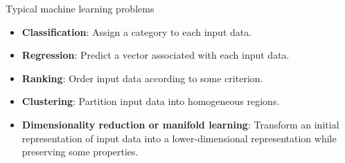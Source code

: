 \documentclass[xcolor={usenames,dvipsnames},handout]{beamer}
\begin{document}
\begin{frame}{Typical machine learning problems}

\begin{itemize}
\item \textbf{Classification}: Assign a category to each input data. 

\vspace{.2cm}

\item \textbf{Regression}: Predict a vector associated with each input data. 

\vspace{.2cm}

\item \textbf{Ranking}: Order input data according to some criterion. 

\vspace{.2cm}

\item \textbf{Clustering}: Partition input data into homogeneous regions. %

\vspace{.2cm}

\item \textbf{Dimensionality reduction or manifold learning}: Transform an initial representation of input data into a lower-dimensional representation  while preserving some properties. 
\end{itemize}

\end{frame}
\end{document}
